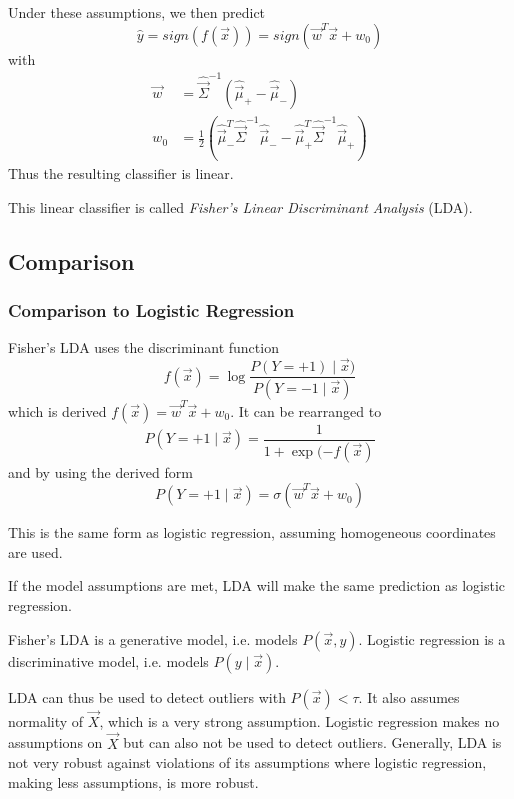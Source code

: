 Under these assumptions, we then predict
\begin{equation*}
\hat{y} = sign(f(\vec{x}))
= sign(\vec{w}^T \vec{x} + w_0)
\end{equation*}
with
\begin{align*}
\vec{w} &= \hat{\vec{\Sigma}}^{-1}
(\hat{\vec{\mu}}_+ - \hat{\vec{\mu}}_-) \\
w_0 &= \frac{1}{2}
\left(
\hat{\vec{\mu}}_-^T \hat{\vec{\Sigma}}^{-1} \hat{\vec{\mu}}_-
-
\hat{\vec{\mu}}_+^T \hat{\vec{\Sigma}}^{-1} \hat{\vec{\mu}}_+
\right)
\end{align*}
Thus the resulting classifier is linear.

This linear classifier is called
\emph{Fisher's Linear Discriminant Analysis}
(LDA).


\subsection{Comparison}
\subsubsection{Comparison to Logistic Regression}
Fisher's LDA uses the discriminant function
\begin{equation*}
f(\vec{x}) = \log{
	\frac{P(Y = +1) \mid \vec{x})}{P(Y = -1 \mid \vec{x})}
}
\end{equation*}
which is derived
$f(\vec{x}) = \vec{w}^T \vec{x} + w_0$.
It can be rearranged to
\begin{equation*}
P(Y = +1 \mid \vec{x}) = \frac{1}{1 + \exp{(-f(\vec{x})}}
\end{equation*}
and by using the derived form
\begin{equation*}
P(Y = +1 \mid \vec{x}) = \sigma(\vec{w}^T \vec{x} + w_0)
\end{equation*}

This is the same form
as logistic regression,
assuming homogeneous coordinates
are used.

If the model assumptions are met,
LDA will make the same prediction
as logistic regression.

Fisher's LDA is a generative model,
i.e. models $P(\vec{x}, y)$.
Logistic regression is a discriminative
model, i.e. models $P(y \mid \vec{x})$.

LDA can thus be used to detect
outliers with $P(\vec{x}) < \tau$.
It also assumes normality of $\vec{X}$,
which is a very strong assumption.
Logistic regression makes no assumptions
on $\vec{X}$ but can also not be
used to detect outliers.
Generally, LDA is not very robust
against violations of its assumptions
where logistic regression,
making less assumptions, is more robust.


